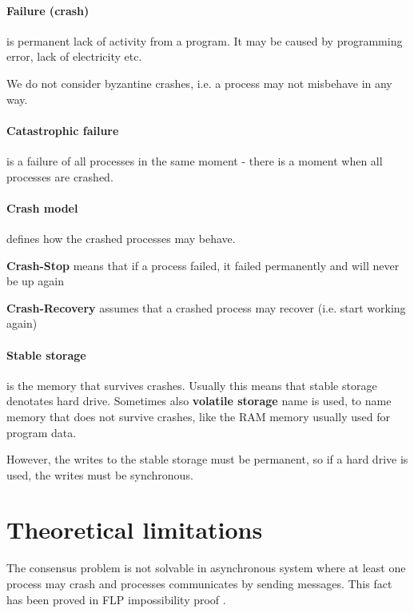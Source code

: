 \paragraph{Failure (crash)}
is permanent lack of activity from a program. It may be caused by programming error, lack of electricity etc.

We do not consider byzantine crashes, i.e. a process may not misbehave in any way.

\paragraph{Catastrophic failure} is a failure of all processes in the same moment - there is a moment when all processes are crashed.

\paragraph{Crash model}
defines how the crashed processes may behave.
\begin{list}{}{ \setlength{\leftmargin}{0.2\textwidth} \setlength{\itemindent}{-0.1\textwidth}}
 \item[\textbf{Crash-Stop}] means that if a process failed, it failed permanently and will never be up again
 \item[\textbf{Crash-Recovery}] assumes that a crashed process may recover (i.e. start working again)
\end{list}

\paragraph{Stable storage}
is the memory that survives crashes. Usually this means that stable storage denotates hard drive.
Sometimes also \textbf{volatile storage} name is used, to name memory that does not survive crashes, like the RAM memory usually used for program data.

However, the writes to the stable storage must be permanent, so if a hard drive is used, the writes must be synchronous.

\section{Theoretical limitations}


The consensus problem is not solvable in asynchronous system where at least one process may crash and processes communicates by sending messages. This fact has been proved in FLP impossibility proof \cite{FLP}.

